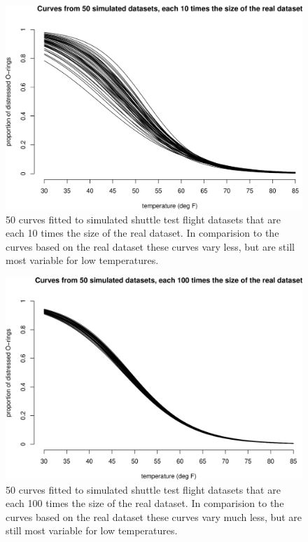 \documentclass[
  11pt,
  british,
  openany, a4paper]{book}
\begin{document}
\begin{figure}

{\centering \includegraphics[width=0.75\linewidth]{images/shuttle_simcurves10} 

}

\caption{50 curves fitted to simulated shuttle test flight datasets that are each 10 times the size of the real dataset.  In comparision to the curves based on the real dataset these curves vary less, but are still most variable for low temperatures.}\label{fig:shuttlesimcurves10}
\end{figure}

\begin{figure}

{\centering \includegraphics[width=0.75\linewidth]{images/shuttle_simcurves100} 

}

\caption{50 curves fitted to simulated shuttle test flight datasets that are each 100 times the size of the real dataset. In comparision to the curves based on the real dataset these curves vary much less, but are still most variable for low temperatures.}\label{fig:shuttlesimcurves100}
\end{figure}
\end{document}
